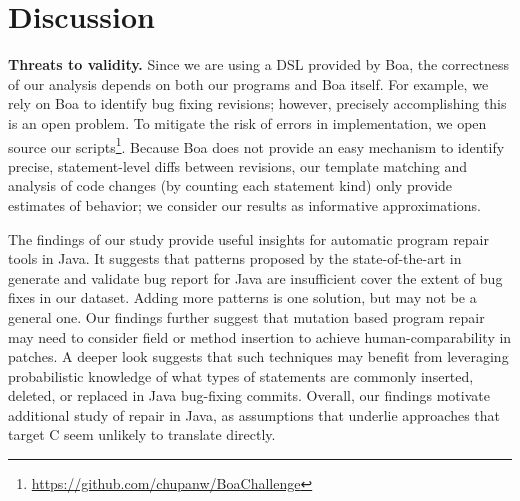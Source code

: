 \documentclass{sig-alternate-05-2015}
\begin{document}
\section{Discussion}

\noindent\textbf{Threats to validity.} Since we are using a DSL
provided by Boa, the correctness of our analysis
depends on both our programs and Boa itself. For example, we rely on Boa to
identify bug fixing revisions; however, precisely accomplishing this is an open
problem.  To mitigate the risk of errors in
implementation, we open source our scripts\footnote{\url{https://github.com/chupanw/BoaChallenge}}.
Because Boa does not provide an easy mechanism
to identify precise, statement-level diffs between revisions, our template
matching and analysis of code changes (by counting each statement kind) only
provide estimates of behavior; we consider our results as informative
approximations. 

The findings of our study provide useful insights for automatic program repair
tools in Java. It suggests that patterns proposed by the state-of-the-art in
generate and validate bug report for Java are insufficient cover the extent of
bug fixes in our dataset.  Adding more patterns is one solution, but may not be
a general one.  Our findings further suggest that
mutation based program repair may need to consider field or method insertion to
achieve human-comparability in patches.  A deeper look suggests that such
techniques may benefit from leveraging probabilistic knowledge of what types of
statements are commonly inserted, deleted, or replaced in Java bug-fixing commits.
Overall, our findings motivate additional study of 
repair in Java, as assumptions that underlie approaches that target C seem
unlikely to translate directly.



\end{document}
